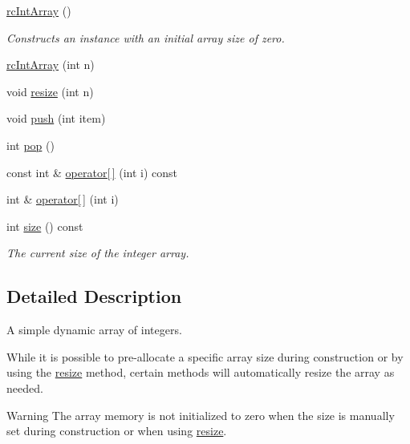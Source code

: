 \begin{DoxyCompactItemize}
\mbox{\label{classrcIntArray_a7c2de9614c66762b3083becbdcaf07d4}} 
\hyperlink{classrcIntArray_a7c2de9614c66762b3083becbdcaf07d4}{rc\+Int\+Array} ()
\begin{DoxyCompactList}\small\item\em Constructs an instance with an initial array size of zero. \end{DoxyCompactList}\item 
\hyperlink{classrcIntArray_ae24aed0e0cb7e79fc0a34de088eba93a}{rc\+Int\+Array} (int n)
\item 
void \hyperlink{classrcIntArray_a2135fb43dd504939a2eadbb78650c155}{resize} (int n)
\item 
void \hyperlink{classrcIntArray_ae52f6cd7ffdd2dba00f6f006853dc441}{push} (int item)
\item 
int \hyperlink{classrcIntArray_a25558e84868988dc42bf5b2b3c9c3a84}{pop} ()
\item 
const int \& \hyperlink{classrcIntArray_a27c2d32c068dfe3021e0bc4efc2ca04c}{operator\mbox{[}$\,$\mbox{]}} (int i) const
\item 
int \& \hyperlink{classrcIntArray_a795c1a259ad8ddb6e2f5143fa721a89d}{operator\mbox{[}$\,$\mbox{]}} (int i)
\item 
\mbox{\label{classrcIntArray_af17b8fb439ac8121af044d4f4d13753c}} 
int \hyperlink{classrcIntArray_af17b8fb439ac8121af044d4f4d13753c}{size} () const
\begin{DoxyCompactList}\small\item\em The current size of the integer array. \end{DoxyCompactList}\end{DoxyCompactItemize}


\subsection{Detailed Description}
A simple dynamic array of integers. 

While it is possible to pre-\/allocate a specific array size during construction or by using the \hyperlink{classrcIntArray_a2135fb43dd504939a2eadbb78650c155}{resize} method, certain methods will automatically resize the array as needed.

\begin{DoxyWarning}{Warning}
The array memory is not initialized to zero when the size is manually set during construction or when using \hyperlink{classrcIntArray_a2135fb43dd504939a2eadbb78650c155}{resize}. 
\end{DoxyWarning}


